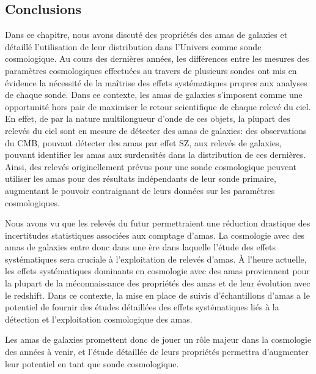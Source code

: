 \subsection{Conclusions}

Dans ce chapitre, nous avons discuté des propriétés des amas de galaxies et détaillé l'utilisation de leur distribution dans l'Univers comme sonde cosmologique.
Au cours des dernières années, les différences entre les mesures des paramètres cosmologiques effectuées au travers de plusieurs sondes ont mis en évidence la nécessité de la maîtrise des effets systématiques propres aux analyses de chaque sonde.
Dans ce contexte, les amas de galaxies s'imposent comme une opportunité hors pair de maximiser le retour scientifique de chaque relevé du ciel.
En effet, de par la nature multilongueur d'onde de ces objets, la plupart des relevés du ciel sont en mesure de détecter des amas de galaxies: des observations du CMB, pouvant détecter des amas par effet SZ, aux relevés de galaxies, pouvant identifier les amas aux surdensités dans la distribution de ces dernières.
Ainsi, des relevés originellement prévus pour une sonde cosmologique peuvent utiliser les amas pour des résultats indépendants de leur sonde primaire, augmentant le pouvoir contraignant de leurs données sur les paramètres cosmologiques.

Nous avons vu que les relevés du futur permettraient une réduction drastique des incertitudes statistiques associées aux comptage d'amas.
La cosmologie avec des amas de galaxies entre donc dans une ère dans laquelle l'étude des effets systématiques sera cruciale à l'exploitation de relevés d'amas.
À l'heure actuelle, les effets systématiques dominants en cosmologie avec des amas proviennent pour la plupart de la méconnaissance des propriétés des amas et de leur évolution avec le redshift.
Dans ce contexte, la mise en place de suivis d'échantillons d'amas a le potentiel de fournir des études détaillées des effets systématiques liés à la détection et l'exploitation cosmologique des amas.

Les amas de galaxies promettent donc de jouer un rôle majeur dans la cosmologie des années à venir, et l'étude détaillée de leurs propriétés permettra d'augmenter leur potentiel en tant que sonde cosmologique.
